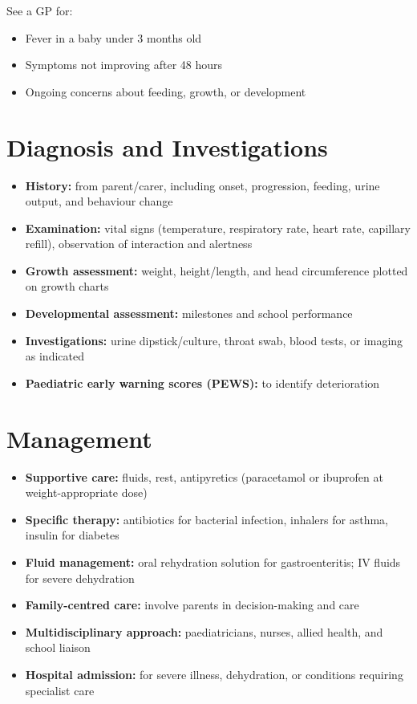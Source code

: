 See a GP for:
\begin{itemize}
    \item Fever in a baby under 3 months old
    \item Symptoms not improving after 48 hours
    \item Ongoing concerns about feeding, growth, or development
\end{itemize}

\section*{Diagnosis and Investigations}
\begin{itemize}
    \item \textbf{History:} from parent/carer, including onset, progression, feeding, urine output, and behaviour change
    \item \textbf{Examination:} vital signs (temperature, respiratory rate, heart rate, capillary refill), observation of interaction and alertness
    \item \textbf{Growth assessment:} weight, height/length, and head circumference plotted on growth charts
    \item \textbf{Developmental assessment:} milestones and school performance
    \item \textbf{Investigations:} urine dipstick/culture, throat swab, blood tests, or imaging as indicated
    \item \textbf{Paediatric early warning scores (PEWS):} to identify deterioration
\end{itemize}

\section*{Management}
\begin{itemize}
    \item \textbf{Supportive care:} fluids, rest, antipyretics (paracetamol or ibuprofen at weight-appropriate dose)
    \item \textbf{Specific therapy:} antibiotics for bacterial infection, inhalers for asthma, insulin for diabetes
    \item \textbf{Fluid management:} oral rehydration solution for gastroenteritis; IV fluids for severe dehydration
    \item \textbf{Family-centred care:} involve parents in decision-making and care
    \item \textbf{Multidisciplinary approach:} paediatricians, nurses, allied health, and school liaison
    \item \textbf{Hospital admission:} for severe illness, dehydration, or conditions requiring specialist care
\end{itemize}

